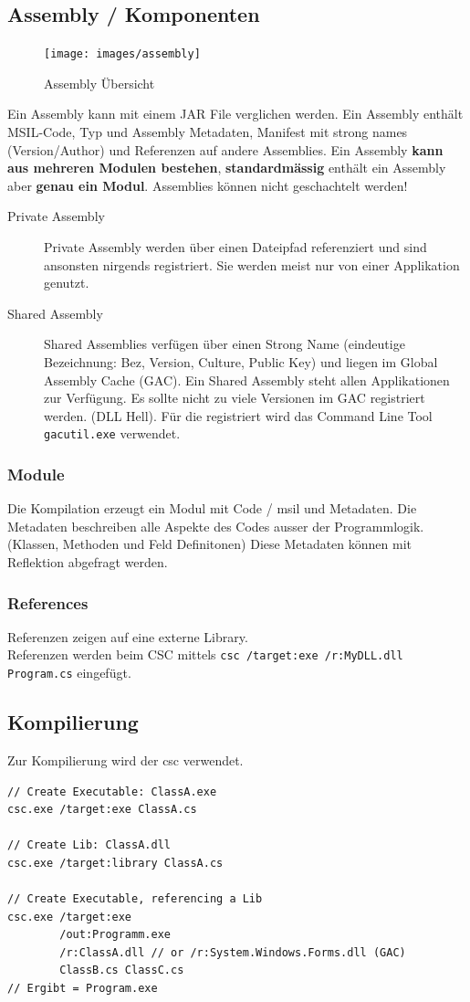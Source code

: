 \subsection{Assembly / Komponenten}
\begin{figure}[h!]
\centering
\texttt{[image: images/assembly]}
\caption{Assembly Übersicht}
\label{fig:assembly}
\end{figure}

Ein Assembly kann mit einem JAR File verglichen werden. Ein Assembly enthält MSIL-Code, Typ und Assembly Metadaten, Manifest mit strong names (Version/Author) und Referenzen auf andere Assemblies. Ein Assembly \textbf{kann aus mehreren Modulen bestehen}, \textbf{standardmässig} enthält ein Assembly aber \textbf{genau ein Modul}. Assemblies können nicht geschachtelt werden!
\begin{description}
	\item[Private Assembly] Private Assembly werden über einen Dateipfad referenziert und sind ansonsten nirgends registriert. Sie werden meist nur von einer Applikation genutzt.
	\item[Shared Assembly] Shared Assemblies verfügen über einen Strong Name (eindeutige Bezeichnung: Bez, Version, Culture, Public Key) und liegen im Global Assembly Cache (GAC). Ein Shared Assembly steht allen Applikationen zur Verfügung. Es sollte nicht zu viele Versionen im GAC registriert werden. (DLL Hell). Für die registriert wird das Command Line Tool \lstinline|gacutil.exe| verwendet.
\end{description}

\subsubsection{Module}
Die Kompilation erzeugt ein Modul mit Code / \gls{msil} und Metadaten. Die Metadaten beschreiben alle Aspekte des Codes ausser der Programmlogik. (Klassen, Methoden und Feld Definitonen) Diese Metadaten können mit Reflektion abgefragt werden.

\subsubsection{References}
Referenzen zeigen auf eine externe Library. \\
Referenzen werden beim CSC mittels \lstinline|csc /target:exe /r:MyDLL.dll Program.cs| eingefügt.


\clearpage

\subsection{Kompilierung}
Zur Kompilierung wird der \gls{csc} verwendet.  
\begin{lstlisting}
// Create Executable: ClassA.exe
csc.exe /target:exe ClassA.cs

// Create Lib: ClassA.dll
csc.exe /target:library ClassA.cs

// Create Executable, referencing a Lib
csc.exe /target:exe
		/out:Programm.exe
		/r:ClassA.dll // or /r:System.Windows.Forms.dll (GAC)
		ClassB.cs ClassC.cs
// Ergibt = Program.exe
\end{lstlisting}

